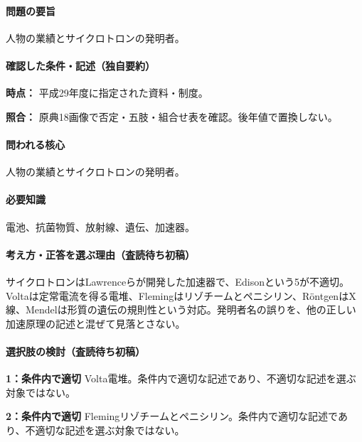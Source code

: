 \paragraph{問題の要旨} 人物の業績とサイクロトロンの発明者。

\paragraph{確認した条件・記述（独自要約）}\mbox{}\par

\noindent\textbf{時点：} 平成29年度に指定された資料・制度。\par

\noindent\textbf{照合：} 原典18画像で否定・五肢・組合せ表を確認。後年値で置換しない。\par

\paragraph{問われる核心} 人物の業績とサイクロトロンの発明者。

\paragraph{必要知識} 電池、抗菌物質、放射線、遺伝、加速器。

\paragraph{考え方・正答を選ぶ理由（査読待ち初稿）} サイクロトロンはLawrenceらが開発した加速器で、Edisonという5が不適切。Voltaは定常電流を得る電堆、Flemingはリゾチームとペニシリン、RöntgenはX線、Mendelは形質の遺伝の規則性という対応。発明者名の誤りを、他の正しい加速原理の記述と混ぜて見落とさない。

\paragraph{選択肢の検討（査読待ち初稿）}\mbox{}\par

\noindent\textbf{1：条件内で適切} Volta電堆。条件内で適切な記述であり、不適切な記述を選ぶ対象ではない。\par

\noindent\textbf{2：条件内で適切} Flemingリゾチームとペニシリン。条件内で適切な記述であり、不適切な記述を選ぶ対象ではない。\par

